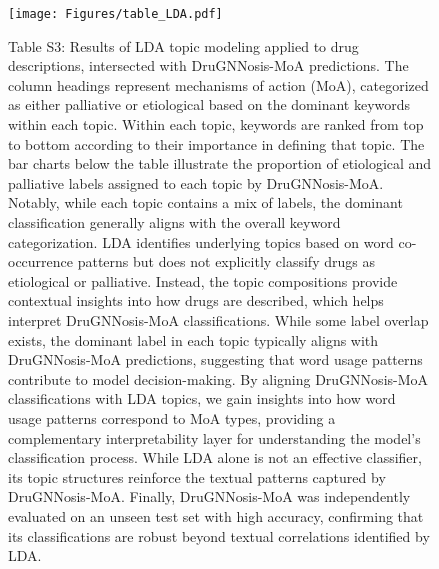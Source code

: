 \documentclass[journal,twoside,web]{ieeecolor}
\begin{document}
\newpage
\begin{figure}[h!]
    \centering
    \caption*{
    Table S3: Results of LDA topic modeling applied to drug descriptions, intersected with DruGNNosis-MoA predictions. 
    The column headings represent mechanisms of action (MoA), categorized as either palliative or etiological based on the dominant keywords within each topic. 
    Within each topic, keywords are ranked from top to bottom according to their importance in defining that topic.
    The bar charts below the table illustrate the proportion of etiological and palliative labels assigned to each topic by DruGNNosis-MoA. 
    Notably, while each topic contains a mix of labels, the dominant classification generally aligns with the overall keyword categorization.
    LDA identifies underlying topics based on word co-occurrence patterns but does not explicitly classify drugs as etiological or palliative. 
    Instead, the topic compositions provide contextual insights into how drugs are described, which helps interpret DruGNNosis-MoA classifications. 
    While some label overlap exists, the dominant label in each topic typically aligns with DruGNNosis-MoA predictions, suggesting that word usage patterns contribute to model decision-making.
    By aligning DruGNNosis-MoA classifications with LDA topics, we gain insights into how word usage patterns correspond to MoA types, providing a complementary interpretability layer for understanding the model’s classification process. 
    While LDA alone is not an effective classifier, its topic structures reinforce the textual patterns captured by DruGNNosis-MoA.
    Finally, DruGNNosis-MoA was independently evaluated on an unseen test set with high accuracy, confirming that its classifications are robust beyond textual correlations identified by LDA.
    }
    \texttt{[image: Figures/table\_LDA.pdf]}
    \label{fig:moa_distributions}
\end{figure}
\end{document}
